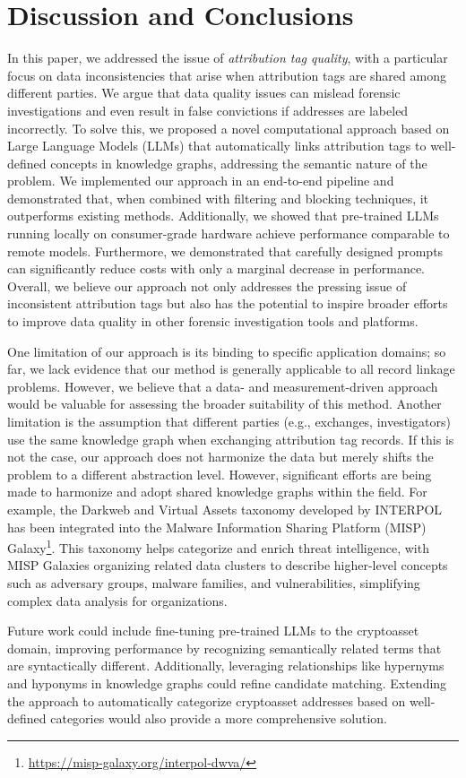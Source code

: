 
\section{Discussion and Conclusions}

In this paper, we addressed the issue of \emph{attribution tag quality}, with a particular focus on data inconsistencies that arise when attribution tags are shared among different parties. We argue that data quality issues can mislead forensic investigations and even result in false convictions if addresses are labeled incorrectly. To solve this, we proposed a novel computational approach based on Large Language Models (LLMs) that automatically links attribution tags to well-defined concepts in knowledge graphs, addressing the semantic nature of the problem. We implemented our approach in an end-to-end pipeline and demonstrated that, when combined with filtering and blocking techniques, it outperforms existing methods. Additionally, we showed that pre-trained LLMs running locally on consumer-grade hardware achieve performance comparable to remote models. Furthermore, we demonstrated that carefully designed prompts can significantly reduce costs with only a marginal decrease in performance. Overall, we believe our approach not only addresses the pressing issue of inconsistent attribution tags but also has the potential to inspire broader efforts to improve data quality in other forensic investigation tools and platforms.

One limitation of our approach is its binding to specific application domains; so far, we lack evidence that our method is generally applicable to all record linkage problems. However, we believe that a data- and measurement-driven approach would be valuable for assessing the broader suitability of this method. Another limitation is the assumption that different parties (e.g., exchanges, investigators) use the same knowledge graph when exchanging attribution tag records. If this is not the case, our approach does not harmonize the data but merely shifts the problem to a different abstraction level. However, significant efforts are being made to harmonize and adopt shared knowledge graphs within the field. For example, the Darkweb and Virtual Assets taxonomy developed by INTERPOL has been integrated into the Malware Information Sharing Platform (MISP) Galaxy\footnote{\url{https://misp-galaxy.org/interpol-dwva/}}. This taxonomy helps categorize and enrich threat intelligence, with MISP Galaxies organizing related data clusters to describe higher-level concepts such as adversary groups, malware families, and vulnerabilities, simplifying complex data analysis for organizations.

Future work could include fine-tuning pre-trained LLMs to the cryptoasset domain, improving performance by recognizing semantically related terms that are syntactically different. Additionally, leveraging relationships like hypernyms and hyponyms in knowledge graphs could refine candidate matching. Extending the approach to automatically categorize cryptoasset addresses based on well-defined categories would also provide a more comprehensive solution.